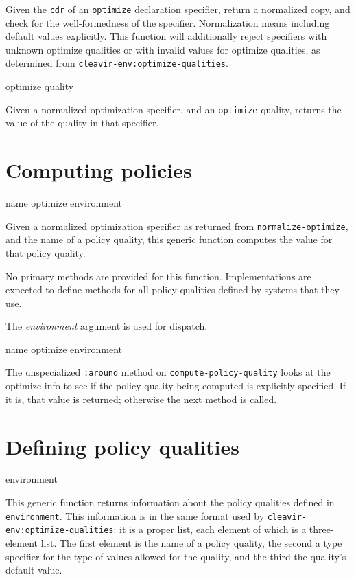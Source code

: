 Given the \texttt{cdr} of an \texttt{optimize} declaration specifier,
return a normalized copy, and check for the well-formedness of the
specifier. Normalization means including default values explicitly.
This function will additionally reject specifiers with unknown
optimize qualities or with invalid values for optimize qualities,
as determined from \texttt{cleavir-env:optimize-qualities}.

 {optimize quality}

Given a normalized optimization specifier, and an \texttt{optimize}
quality, returns the value of the quality in that specifier.

\section{Computing policies}

 {name optimize environment}

Given a normalized optimization specifier as returned from
\texttt{normalize-optimize}, and the name of a policy quality, this
generic function computes the value for that policy quality.

No primary methods are provided for this function. Implementations
are expected to define methods for all policy qualities defined by
\sysname{} systems that they use.

The \textit{environment} argument is used for dispatch.

 {name optimize environment}

The unspecialized \texttt{:around} method on \texttt{compute-policy-quality}
looks at the optimize info to see if the policy quality being computed
is explicitly specified. If it is, that value is returned; otherwise
the next method is called.

\section{Defining policy qualities}

 {environment}

This generic function returns information about the policy qualities
defined in \texttt{environment}. This information is in the same
format used by \texttt{cleavir-env:optimize-qualities}: it is a
proper list, each element of which is a three-element list. The first
element is the name of a policy quality, the second a type specifier
for the type of values allowed for the quality, and the third the
quality's default value.

